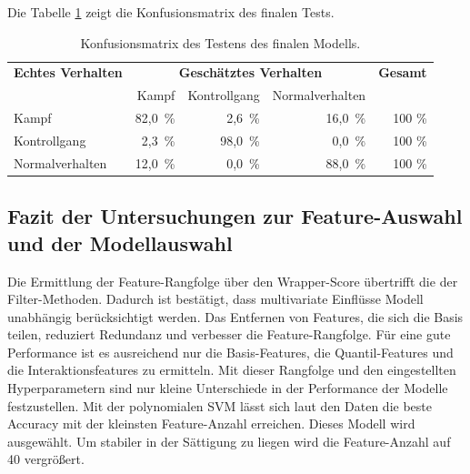 Die Tabelle \ref{tab:KonfMatr} zeigt die Konfusionsmatrix des finalen Tests.

\begin{table}[htbp]
    \centering
    \caption{Konfusionsmatrix des Testens des finalen Modells.}
    \label{tab:KonfMatr}
    \begin{tabular}{l|rrr|r}
        \toprule
        \multirow{1}{*}{\textbf{Echtes Verhalten}} & \multicolumn{3}{c|}{\textbf{Geschätztes Verhalten}} & {\textbf{Gesamt}}\\
         & Kampf & Kontrollgang & Normalverhalten & \\
        \midrule
        Kampf                & 82,0\, \% &  2,6\, \% & 16,0\, \% & 100 \%\\
        Kontrollgang         &  2,3\, \% & 98,0\, \% &  0,0\, \% & 100 \%\\
        Normalverhalten      & 12,0\, \% &  0,0\, \% & 88,0\, \% & 100 \%\\
        \bottomrule
    \end{tabular}
\end{table}

\clearpage
\subsection{Fazit der Untersuchungen zur Feature-Auswahl und der Modellauswahl}
Die Ermittlung der Feature-Rangfolge über den Wrapper-Score übertrifft die der Filter-Methoden. Dadurch ist bestätigt, dass multivariate Einflüsse Modell unabhängig berücksichtigt werden. Das Entfernen von Features, die sich die Basis teilen, reduziert Redundanz und verbesser die Feature-Rangfolge. Für eine gute Performance ist es ausreichend nur die Basis-Features, die Quantil-Features und die Interaktionsfeatures zu ermitteln. Mit dieser Rangfolge und den eingestellten Hyperparametern sind nur kleine Unterschiede in der Performance der Modelle festzustellen. Mit der polynomialen SVM lässt sich laut den Daten die beste Accuracy mit der kleinsten Feature-Anzahl erreichen. Dieses Modell wird ausgewählt. Um stabiler in der Sättigung zu liegen wird die Feature-Anzahl auf 40 vergrößert.